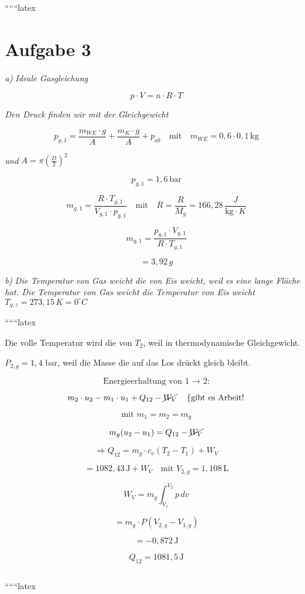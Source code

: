 
``````latex


\section*{Aufgabe 3}

\textit{a)} \textit{Ideale Gasgleichung}

\[
p \cdot V = n \cdot R \cdot T
\]

\textit{Den Druck finden wir mit der Gleichgewicht}

\[
p_{g,1} = \frac{m_{WE} \cdot g}{A} + \frac{m_K \cdot g}{A} + p_{ab} \quad \text{mit} \quad m_{WE} = 0,6 \cdot 0,1 \, \text{kg}
\]

\textit{und} \quad $A = \pi \left( \frac{D}{2} \right)^2$

\[
p_{g,1} = 1,6 \, \text{bar}
\]

\[
m_{g,1} = \frac{R \cdot T_{g,1}}{V_{g,1} \cdot p_{g,1}} \quad \text{mit} \quad R = \frac{R}{M_g} = 166,28 \, \frac{J}{\text{kg} \cdot K}
\]

\[
m_{g,1} = \frac{p_{g,1} \cdot V_{g,1}}{R \cdot T_{g,1}}
\]

\[
= 3,92 \, g
\]

\textit{b)} \textit{Die Temperatur von Gas weicht die von Eis weicht, weil es eine lange Fläche hat. Die Temperatur von Gas weicht die Temperatur von Eis weicht} $T_{g,z} = 273,15 \, K = 0^\circ C$

``````latex


Die volle Temperatur wird die von $T_{2}$, weil in thermodynamische Gleichgewicht.

$P_{2,g} = 1,4 \text{ bar}$, weil die Masse die auf das Los drückt gleich bleibt.

\[
\text{Energieerhaltung von 1 $\rightarrow$ 2:}
\]

\[
m_{2} \cdot u_{2} - m_{1} \cdot u_{1} + Q_{12} - \cancel{W_{V}} \quad \left\{ \text{gibt es Arbeit!} \right.
\]

\[
\text{mit } m_{1} = m_{2} = m_{g}
\]

\[
m_{g} (u_{2} - u_{1}) = Q_{12} - \cancel{W_{V}}
\]

\[
\Rightarrow Q_{12} = m_{g} \cdot c_{v} (T_{2} - T_{1}) + W_{V}
\]

\[
= 1082,43 \, \text{J} + W_{V} \quad \text{mit } V_{2,g} = 1,108 \, \text{L}
\]

\[
W_{V} = m_{g} \int_{V_{1}}^{V_{2}} p \, dv
\]

\[
= m_{g} \cdot P \left( V_{2,g} - V_{1,g} \right)
\]

\[
= -0,872 \, \text{J}
\]

\[
Q_{12} = 1081,5 \, \text{J}
\]

\[
\boxed{}
\]

``````latex


